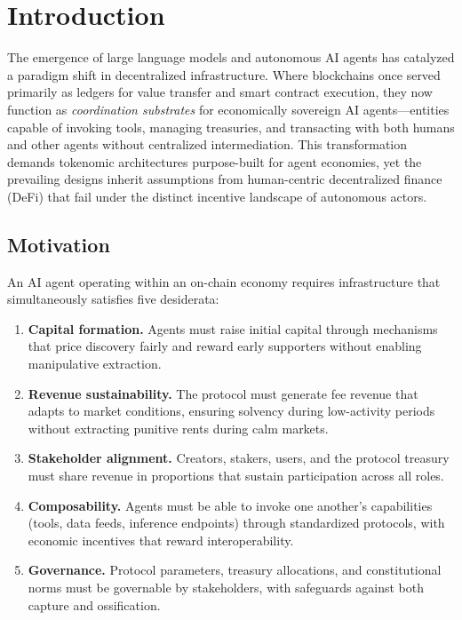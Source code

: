 \section{Introduction}
\label{sec:introduction}

The emergence of large language models and autonomous AI agents has catalyzed a
paradigm shift in decentralized infrastructure. Where blockchains once served
primarily as ledgers for value transfer and smart contract execution, they now
function as \emph{coordination substrates} for economically sovereign AI
agents---entities capable of invoking tools, managing treasuries, and
transacting with both humans and other agents without centralized intermediation.
This transformation demands tokenomic architectures purpose-built for agent
economies, yet the prevailing designs inherit assumptions from human-centric
decentralized finance (DeFi) that fail under the distinct incentive landscape of
autonomous actors.

\subsection{Motivation}
\label{subsec:motivation}

An AI agent operating within an on-chain economy requires infrastructure that
simultaneously satisfies five desiderata:

\begin{enumerate}
  \item \textbf{Capital formation.} Agents must raise initial capital through
    mechanisms that price discovery fairly and reward early supporters without
    enabling manipulative extraction.
  \item \textbf{Revenue sustainability.} The protocol must generate fee revenue
    that adapts to market conditions, ensuring solvency during low-activity
    periods without extracting punitive rents during calm markets.
  \item \textbf{Stakeholder alignment.} Creators, stakers, users, and the
    protocol treasury must share revenue in proportions that sustain
    participation across all roles.
  \item \textbf{Composability.} Agents must be able to invoke one another's
    capabilities (tools, data feeds, inference endpoints) through standardized
    protocols, with economic incentives that reward interoperability.
  \item \textbf{Governance.} Protocol parameters, treasury allocations, and
    constitutional norms must be governable by stakeholders, with safeguards
    against both capture and ossification.
\end{enumerate}

